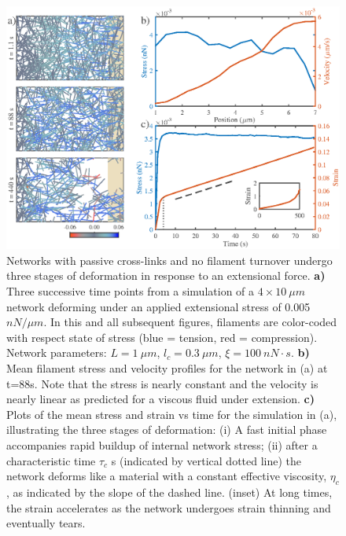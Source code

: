 \documentclass[10pt,letterpaper]{article}
\begin{document}
\begin{figure}[h!]
\centering
\includegraphics[width=\hsize]{figures/figure3a}
\caption{\label{fig:passive_ex}  Networks with passive cross-links and no filament turnover undergo three stages of deformation in response to an extensional force.   \textbf{a)} Three successive time points from a simulation of a $4\times10\: \mu m$ network deforming under an applied extensional stress of 0.005 $nN/\mu m$. In this and all subsequent figures, filaments are color-coded with respect state of stress (blue = tension, red = compression).  Network parameters: $L=1\: \mu m$, $l_c=0.3\: \mu m$, $\xi=100\: nN\cdot s$. \textbf{b)} Mean filament stress and velocity profiles for the  network in (a) at t=88s. Note that the stress is nearly constant and the velocity is nearly linear as predicted for a viscous fluid under extension.  \textbf{c)} Plots of the mean stress and strain
vs time for the simulation in (a), illustrating the three stages of deformation: (i) A fast initial phase accompanies rapid buildup of internal network stress; (ii) after a characteristic time $\tau_c$ s (indicated by vertical dotted line) the network deforms like a material with a constant effective viscosity, $\eta_c$, as indicated by the slope of the dashed line.  (inset) At long times, the strain accelerates as the network undergoes strain thinning and eventually tears. }
\end{figure}

\end{document}
